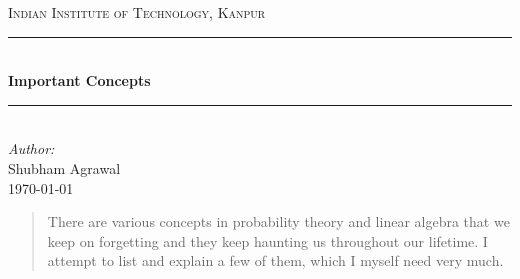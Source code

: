 \documentclass[12pt]{article}
\begin{document}
	\begin{titlepage}
		
		\newcommand{\HRule}{\rule{\linewidth}{0.5mm}} %
		\center %
		 
		\textsc{\LARGE Indian Institute of Technology, Kanpur}\\[1.5cm] 
		
		
		\HRule \\[0.4cm]
		{ \huge \bfseries Important Concepts}\\[0.4cm] %
		\HRule \\[1.5cm]
		 
		\Large \emph{Author:}\\
		Shubham Agrawal\\[3cm] %
		
		
		{\large \today}\\[2cm] %
		
		\vfill %
	
	\end{titlepage}
	
	
	\begin{abstract}
	There are various concepts in probability theory and linear algebra that we keep on forgetting and they keep haunting us throughout our lifetime. I attempt to list and explain a few of them, which I myself need very much. 
	\end{abstract}
	
\end{document}
